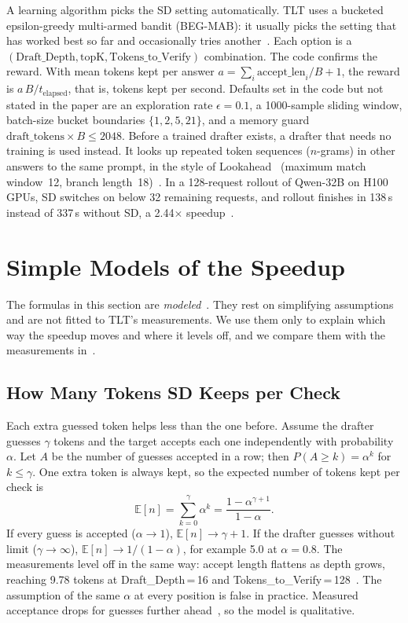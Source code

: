 \documentclass[conference]{IEEEtran}
\newcommand{\x}{\ensuremath{\times}}
\begin{document}
A learning algorithm picks the SD setting automatically. TLT uses a bucketed epsilon-greedy multi-armed bandit (BEG-MAB): it usually picks the setting that has worked best so far and occasionally tries another~\cite[Sec.~5.2, Alg.~1]{hu2026tlt}. Each option is a $(\text{Draft\_Depth}, \text{topK}, \text{Tokens\_to\_Verify})$ combination. The code confirms the reward. With mean tokens kept per answer $a=\sum_i \text{accept\_len}_i/B + 1$, the reward is $a\,B/t_{\text{elapsed}}$, that is, tokens kept per second. Defaults set in the code but not stated in the paper are an exploration rate $\epsilon=0.1$, a 1000-sample sliding window, batch-size bucket boundaries $\{1,2,5,21\}$, and a memory guard $\text{draft\_tokens}\times B\le 2048$. Before a trained drafter exists, a drafter that needs no training is used instead. It looks up repeated token sequences ($n$-grams) in other answers to the same prompt, in the style of Lookahead~\cite{zhao2024lookahead} (maximum match window~12, branch length~18)~\cite[Sec.~5.3]{hu2026tlt}. In a 128-request rollout of Qwen-32B on H100 GPUs, SD switches on below 32 remaining requests, and rollout finishes in 138\,s instead of 337\,s without SD, a 2.44\x{} speedup~\cite[Fig.~14]{hu2026tlt}.

\section{Simple Models of the Speedup}
\label{sec:model}

The formulas in this section are \emph{modeled}~\cite{hibbs2026dashboard}. They rest on simplifying assumptions and are not fitted to TLT's measurements. We use them only to explain which way the speedup moves and where it levels off, and we compare them with the measurements in~\cite{hu2026tlt}.

\subsection{How Many Tokens SD Keeps per Check}
\label{sec:model-en}
Each extra guessed token helps less than the one before. Assume the drafter guesses $\gamma$ tokens and the target accepts each one independently with probability $\alpha$. Let $A$ be the number of guesses accepted in a row; then $P(A\ge k)=\alpha^{k}$ for $k\le\gamma$. One extra token is always kept, so the expected number of tokens kept per check is
\begin{equation}
\mathbb{E}[n] = \sum_{k=0}^{\gamma}\alpha^{k} = \frac{1-\alpha^{\gamma+1}}{1-\alpha}.
\label{eq:en}
\end{equation}
If every guess is accepted ($\alpha\to1$), $\mathbb{E}[n]\to\gamma+1$. If the drafter guesses without limit ($\gamma\to\infty$), $\mathbb{E}[n]\to1/(1-\alpha)$, for example 5.0 at $\alpha=0.8$. The measurements level off in the same way: accept length flattens as depth grows, reaching 9.78 tokens at Draft\_Depth\,=\,16 and Tokens\_to\_Verify\,=\,128~\cite[Fig.~13a]{hu2026tlt}. The assumption of the same $\alpha$ at every position is false in practice. Measured acceptance drops for guesses further ahead~\cite[Fig.~16]{hu2026tlt}, so the model is qualitative.
\end{document}
